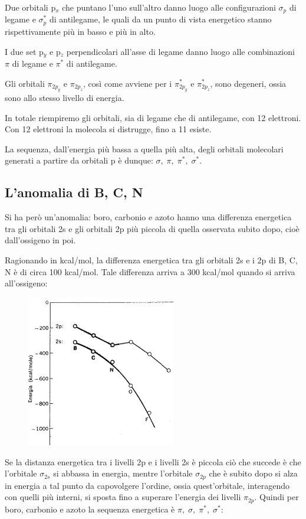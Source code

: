 \vspace{0.2cm}Due orbitali p$_x$ che puntano l'uno sull'altro danno luogo alle configurazioni $\sigma_p$ di legame e $\sigma^*_p$ di antilegame, le quali da un punto di vista energetico stanno rispettivamente più in basso e più in alto.

I due set p$_y$ e p$_z$ perpendicolari all'asse di legame danno luogo alle combinazioni $\pi$ di legame e $\pi^*$ di antilegame.

Gli orbitali $\pi_{2p_y}$ e $\pi_{2p_z}$, così come avviene per i $\pi_{2p_y}^*$ e $\pi_{2p_z}^*$, sono degeneri, ossia sono allo stesso livello di energia.

In totale riempiremo gli orbitali, sia di legame che di antilegame, con 12 elettroni. Con 12 elettroni la molecola si distrugge, fino a 11 esiste.

La sequenza, dall'energia più bassa a quella più alta, degli orbitali molecolari generati a partire da orbitali p è dunque: $\sigma, \; \pi, \; \pi^*, \; \sigma^*$.
\subsection{L'anomalia di B, C, N}
Si ha però un'anomalia: boro, carbonio e azoto hanno una differenza energetica tra gli orbitali 2s e gli orbitali 2p più piccola di quella osservata subito dopo, cioè dall'ossigeno in poi.

Ragionando in kcal/mol, la differenza energetica tra gli orbitali 2s e i 2p di B, C, N è di circa 100 kcal/mol. Tale differenza arriva a 300 kcal/mol quando si arriva all'ossigeno:
\newpage
\begin{figure}[htp]
    \centering
    \includegraphics[width=6.5cm]{immagini/differenza_energia_2s_2p.png}
\end{figure}

Se la distanza energetica tra i livelli 2p e i livelli 2s è piccola ciò che succede è che l'orbitale $\sigma_{2s}$ si abbassa in energia, mentre l'orbitale $\sigma_{2p}$ che è subito dopo si alza in energia a tal punto da capovolgere l'ordine, ossia quest'orbitale, interagendo con quelli più interni, si sposta fino a superare l'energia dei livelli $\pi_{2p}$. Quindi per boro, carbonio e azoto la sequenza energetica è $\pi,\; \sigma, \; \pi^*, \; \sigma^*$:

